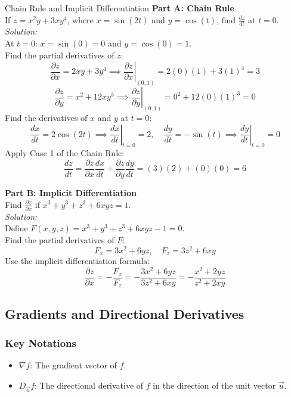 \documentclass[11pt]{article}
\begin{document}
\begin{examplebox}{Chain Rule and Implicit Differentiation}
    \textbf{Part A: Chain Rule}\\
    If $z = x^2y + 3xy^4$, where $x = \sin(2t)$ and $y = \cos(t)$, find $\frac{dz}{dt}$ at $t=0$.\\
    \textit{Solution:}\\
    At $t = 0$: $x = \sin(0) = 0$ and $y = \cos(0) = 1$.\\
    Find the partial derivatives of $z$:
    \[ \frac{\partial z}{\partial x} = 2xy + 3y^4 \implies \left.\frac{\partial z}{\partial x}\right|_{(0,1)} = 2(0)(1) + 3(1)^4 = 3 \]
    \[ \frac{\partial z}{\partial y} = x^2 + 12xy^3 \implies \left.\frac{\partial z}{\partial y}\right|_{(0,1)} = 0^2 + 12(0)(1)^3 = 0 \]
    Find the derivatives of $x$ and $y$ at $t = 0$:
    \[ \frac{dx}{dt} = 2\cos(2t) \implies \left.\frac{dx}{dt}\right|_{t=0} = 2, \quad \frac{dy}{dt} = -\sin(t) \implies \left.\frac{dy}{dt}\right|_{t=0} = 0 \]
    Apply Case 1 of the Chain Rule:
    \[ \frac{dz}{dt} = \frac{\partial z}{\partial x}\frac{dx}{dt} + \frac{\partial z}{\partial y}\frac{dy}{dt} = (3)(2) + (0)(0) = 6 \]
    
    \textbf{Part B: Implicit Differentiation}\\
    Find $\frac{\partial z}{\partial x}$ if $x^3 + y^3 + z^3 + 6xyz = 1$.\\
    \textit{Solution:}\\
    Define $F(x,y,z) = x^3 + y^3 + z^3 + 6xyz - 1 = 0$.\\
    Find the partial derivatives of $F$:
    \[ F_x = 3x^2 + 6yz, \quad F_z = 3z^2 + 6xy \]
    Use the implicit differentiation formula:
    \[ \frac{\partial z}{\partial x} = -\frac{F_x}{F_z} = -\frac{3x^2 + 6yz}{3z^2 + 6xy} = -\frac{x^2 + 2yz}{z^2 + 2xy} \]
\end{examplebox}


\subsection{Gradients and Directional Derivatives}
\subsubsection*{Key Notations}
\begin{itemize}
    \item $\nabla f$: The gradient vector of $f$.
    \item $D_{\vec{u}}f$: The directional derivative of $f$ in the direction of the unit vector $\vec{u}$.
\end{itemize}
\end{document}
